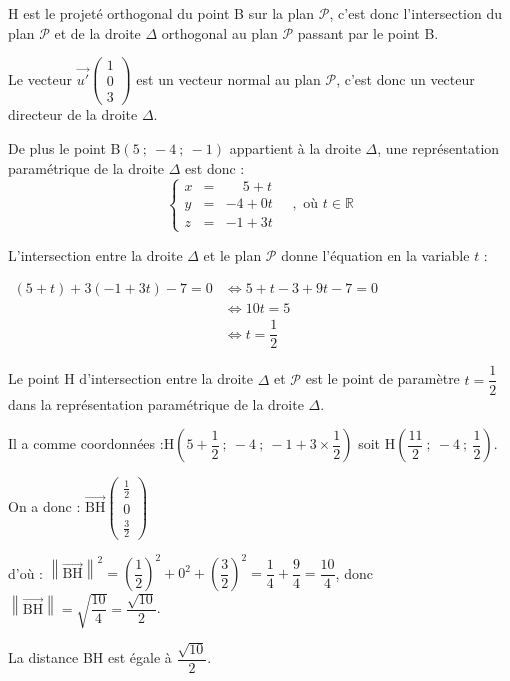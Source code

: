 \documentclass[10pt]{article}
\providecommand{\R}{\mathbb{R}}
\providecommand{\vect}[1]{\overrightarrow{#1}}
\begin{document}
H est le projeté orthogonal du point B sur la plan $\mathcal{P}$, c'est donc l'intersection du plan $\mathcal{P}$ et de la droite $\Delta$ orthogonal au plan $\mathcal{P}$ passant par le point B.

Le vecteur $\vect{u'}\begin{pmatrix}1\\0\\3\end{pmatrix}$ est un vecteur normal au plan $\mathcal{P}$, c'est donc un vecteur directeur de la droite $\Delta$.

De plus le point B$(5~;~-4~;~-1)$ appartient à la droite $\Delta$, une représentation paramétrique de la droite $\Delta$ est donc :
\[\left\{\begin{array}{lcr}
x&=&\phantom{-}5+t \\
y&=&-4 + 0t \\
z&=&-1+3t
\end{array} \quad, \text { où } t \in \R\right.\]

L'intersection entre la droite $\Delta$ et le plan $\mathcal{P}$ donne l'équation en la variable $t$ :

$\begin{aligned} (5+t)+3(-1+3t)-7=0 &\iff 5+t-3+9t-7=0\\
	& \iff 10t=5\\
	& \iff t=\dfrac{1}{2}
\end{aligned}$

Le point H d'intersection entre la droite $\Delta$ et $\mathcal{P}$ est le point de paramètre  $ t=\dfrac{1}{2}$ dans la représentation paramétrique de la droite $\Delta$.

Il a comme coordonnées :\quad$\mathrm{H}\left(5 + \dfrac{1}{2}~;~-4~;~-1 + 3 \times\dfrac{1}{2}\right)$ soit $\mathrm{H}\left(\dfrac{11}{2}~;~-4~;~\dfrac{1}{2}\right)$.

On a donc : $\vect{\mathrm{BH}}\begin{pmatrix}\frac{1}{2}\\0\\\frac{3}{2}\end{pmatrix}$

d'où : $\left\|\vect {\mathrm{BH}}\right\|^2=\left(\dfrac{1}{2}\right)^2+0^2+\left(\dfrac{3}{2}\right)^2=\dfrac{1}{4}+\dfrac{9}{4}=\dfrac{10}{4}$, donc $\left\|\vect {\mathrm{BH}}\right\|=\sqrt{\dfrac{10}{4}}=\dfrac{\sqrt{10}}{2}$.

La distance BH est égale à $\dfrac{\sqrt{10}}{2}$.
\end{document}
